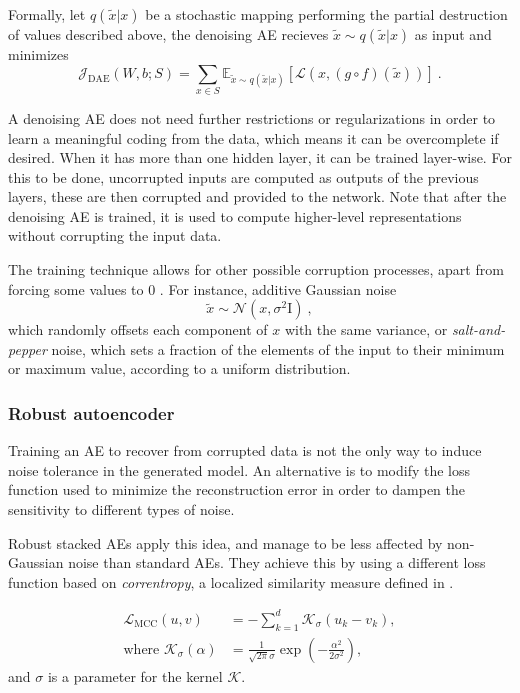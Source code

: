 Formally, let $q(\tilde x\vert x)$ be a stochastic mapping performing the partial destruction of values described above, the denoising AE recieves $\tilde x\sim q(\tilde x\vert x)$ as input and minimizes
\begin{equation}
  \mathcal J_{\mathrm{DAE}}(W,b;S)=\sum_{x\in S}\mathbb E_{\tilde x \sim q(\tilde x \vert x)} \left[\mathcal L(x, (g\circ f)(\tilde x))\right]~.
\end{equation}

A denoising AE does not need further restrictions or regularizations in order to learn a meaningful coding from the data, which means it can be overcomplete if desired. When it has more than one hidden layer, it can be trained layer-wise. For this to be done, uncorrupted inputs are computed as outputs of the previous layers, these are then corrupted and provided to the network. Note that after the denoising AE is trained, it is used to compute higher-level representations without corrupting the input data.

The training technique allows for other possible corruption processes, apart from forcing some values to 0 \cite{vincent2010stacked}. For instance, additive Gaussian noise
\begin{equation}
  \tilde x \sim \mathcal N(x, \sigma^2 \mathrm I)~,
\end{equation}
which randomly offsets each component of $x$ with the same variance, or \textit{salt-and-pepper} noise, which sets a fraction of the elements of the input to their minimum or maximum value, according to a uniform distribution.

\subsubsection{Robust autoencoder}

Training an AE to recover from corrupted data is not the only way to induce noise tolerance in the generated model. An alternative is to modify the loss function used to minimize the reconstruction error in order to dampen the sensitivity to different types of noise.

Robust stacked AEs \cite{qi_robust_2014} apply this idea, and manage to be less affected by non-Gaussian noise than standard AEs. They achieve this by using a different loss function based on \textit{correntropy}, a localized similarity measure defined in \cite{liu_correntropy_2006}. 

\begin{align}
  \mathcal L_{\mathrm{MCC}}(u, v)&=-\sum_{k=1}^d\mathcal K_{\sigma}(u_k-v_k),\\\text{where }
  \mathcal K_{\sigma}(\alpha)&=\frac{1}{\sqrt{2\pi}\sigma}\exp\left(-\frac{\alpha^2}{2\sigma^2}\right),
\end{align}
and $\sigma$ is a parameter for the kernel $\mathcal K$.

